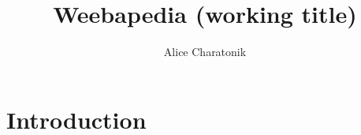 \documentclass[a4paper]{article}
\title{Weebapedia (working title)}
\author{Alice Charatonik}
\date{}
\begin{document}
\maketitle

\section{Introduction}
\end{document}
